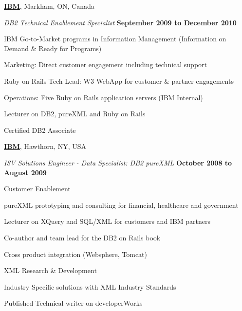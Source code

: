 \documentclass[10pt]{article}
\newenvironment{outerlist}[1][\enskip\textbullet]%
        {\begin{enumerate}[#1]}{\end{enumerate}%
         \vspace{-.6\baselineskip}}
\newenvironment{innerlist}[1][\enskip\textbullet]%
        {\begin{compactenum}[#1]}{\end{compactenum}}
\newcommand{\blankline}{\quad\pagebreak[2]}
\begin{document}
\blankline

\href{http://www.ibm.com/}{\textbf{IBM}}, 
Markham, ON, Canada
\begin{outerlist}

  \item[] \textit{DB2 Technical Enablement Specialist}%
          \hfill \textbf{September 2009 to December 2010}
  \begin{innerlist}
\item IBM Go-to-Market programs in Information Management (Information on Demand \& Ready for Programs)
\item Marketing: Direct customer engagement including technical support
\item Ruby on Rails Tech Lead: W3 WebApp for customer \& partner engagements
\item Operations: Five Ruby on Rails application servers (IBM Internal)
\item Lecturer on DB2, pureXML and Ruby on Rails
\item Certified DB2 Associate
  \end{innerlist}

\end{outerlist}

\blankline

\href{http://www.ibm.com/}{\textbf{IBM}}, 
Hawthorn, NY, USA
\begin{outerlist}

  \item[] \textit{ISV Solutions Engineer - Data Specialist: DB2 pureXML}%
          \hfill \textbf{October 2008 to August 2009}
  \begin{innerlist}
\item Customer Enablement
\item pureXML prototyping and consulting for financial, healthcare and government
\item Lecturer on XQuery and SQL/XML for customers and IBM partners
\item Co-author and team lead for the DB2 on Rails book
\item Cross product integration (Websphere, Tomcat)
\item XML Research \& Development
\item Industry Specific solutions with XML Industry Standards
\item Published Technical writer on developerWorks
  \end{innerlist}

\end{outerlist}
\end{document}
